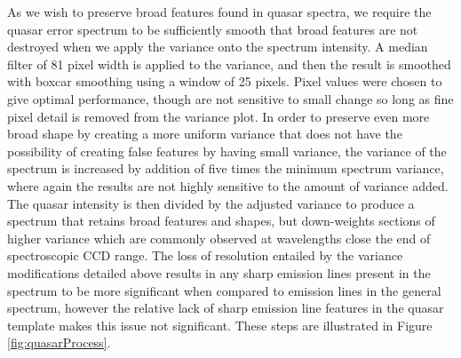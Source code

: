 \documentclass[5p]{elsarticle}
\begin{document}
As we wish to preserve broad features found in quasar spectra, we require the quasar error spectrum to be sufficiently smooth that broad features are not destroyed when we apply the variance onto the spectrum intensity. A median filter of 81 pixel width is applied to the variance, and then the result is smoothed with boxcar smoothing using a window of 25 pixels. Pixel values were chosen to give optimal performance, though are not sensitive to small change so long as fine pixel detail is removed from the variance plot. In order to preserve even more broad shape by creating a more uniform variance that does not have the possibility of creating false features by having small variance, the variance of the spectrum is increased by addition of five times the minimum spectrum variance, where again the results are not highly sensitive to the amount of variance added. The quasar intensity is then divided by the adjusted variance to produce a spectrum that retains broad features and shapes, but down-weights sections of higher variance which are commonly observed at wavelengths close the end of spectroscopic CCD range. The loss of resolution entailed by the variance modifications detailed above results in any sharp emission lines present in the spectrum to be more significant when compared to emission lines in the general spectrum, however the relative lack of sharp emission line features in the quasar template makes this issue not significant. These steps are illustrated in Figure \ref{fig:quasarProcess}.\\
\end{document}
